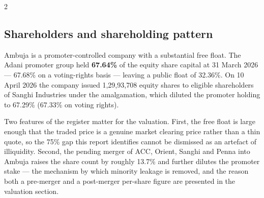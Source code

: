 \begin{paracol}{2}
\subsection{Shareholders and shareholding pattern}

Ambuja is a promoter-controlled company with a substantial free float. The Adani
promoter group held \textbf{67.64\%} of the equity share capital at 31 March 2026 —
67.68\% on a voting-rights basis — leaving a public float of 32.36\%. On 10 April 2026
the company issued 1,29,93,708 equity shares to eligible shareholders of Sanghi
Industries under the amalgamation, which diluted the promoter holding to 67.29\%
(67.33\% on voting rights).

Two features of the register matter for the valuation. First, the free float is large
enough that the traded price is a genuine market clearing price rather than a thin
quote, so the 75\% gap this report identifies cannot be dismissed as an artefact of
illiquidity. Second, the pending merger of ACC, Orient, Sanghi and Penna into Ambuja
raises the share count by roughly 13.7\% and further dilutes the promoter stake — the
mechanism by which minority leakage is removed, and the reason both a pre-merger and a
post-merger per-share figure are presented in the valuation section.

\switchcolumn
{}





\end{paracol}
